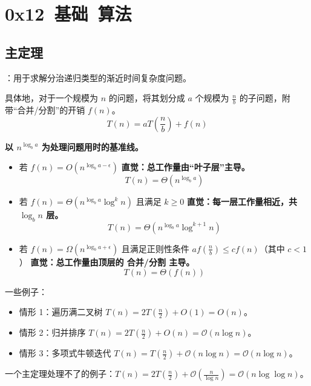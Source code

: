 \section{0x12\ 基础\ 算法}
\label{sec:0x12}

\subsection{主定理}

：用于求解分治递归类型的渐近时间复杂度问题。

具体地，对于一个规模为 $n$ 的问题，将其划分成 $a$ 个规模为 $\frac{n}{b}$ 的子问题，附带“合并/分割”的开销 $f(n)$。
\[
T(n) = aT\left( \frac{n}{b} \right) + f(n)
\]

\textbf{以 $n^{\log_b a}$ 为处理问题用时的基准线。}

\begin{itemize}
    \item 若 $f(n) = O(n^{\log_b a - \epsilon})$\newline{}
    \textbf{直觉：总工作量由“叶子层”主导。}
    \[
    T(n) = \Theta(n^{\log_b a})
    \]

    \item 若 $f(n) = \Theta(n^{\log_b a}\log^k n)$ 且满足 $k\geq 0$\newline{}
    \textbf{直觉：每一层工作量相近，共 $\log_b n$ 层。}
    \[
    T(n) = \Theta(n^{\log_b a}\log^{k + 1} n)
    \]

    \item 若 $f(n) = \Omega(n^{\log_b a + \epsilon})$ 且满足正则性条件 $af(\frac{n}{b}) \leq cf(n)$（其中 $c < 1$）\newline{}
    \textbf{直觉：总工作量由顶层的 合并/分割 主导。}
    \[
    T(n) = \Theta(f(n))
    \]
\end{itemize}

\begin{quoteblock}
一些例子：

\begin{itemize}
    \item 情形 1：遍历满二叉树 $T(n) = 2T(\frac{n}{2}) + O(1) = O(n)$。
    \item 情形 2：归并排序 $T(n) = 2T(\frac{n}{2}) + O(n) = \mathcal{O}(n \log n)$。
    \item 情形 3：多项式牛顿迭代 $T(n) = T(\frac{n}{2}) + \mathcal{O}(n \log n) = \mathcal{O}(n \log n)$。
\end{itemize}

一个主定理处理不了的例子：$T(n) = 2T\left(\frac{n}{2}\right) + \mathcal{O}\left(\frac{n}{\log n}\right) = \mathcal{O}(n \log \log n)$。
\end{quoteblock}

